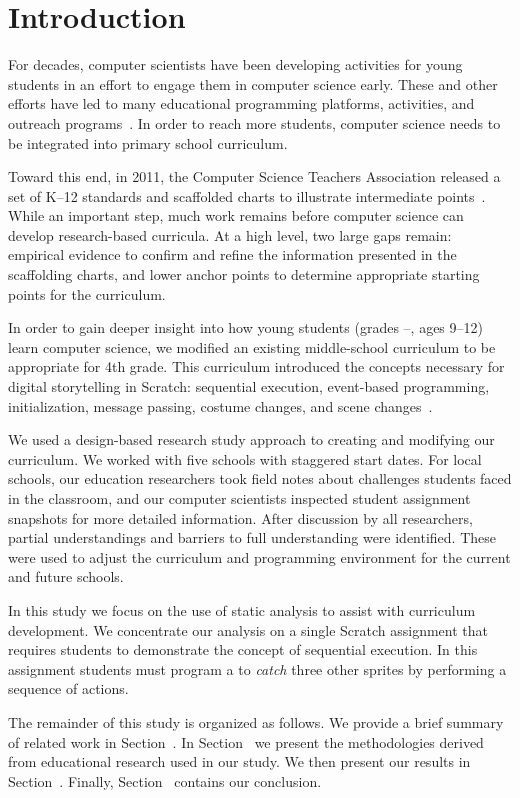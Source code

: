 \section{Introduction}
For decades, computer scientists have been developing activities for young
students in an effort to engage them in computer science early. These and other
efforts have led to many educational programming platforms, activities, and
outreach programs~\cite{wayanoutpost, georgiaoutreach,
  Franklin:2011:ATA:1953163.1953295, Maloney:2010:SPL:1868358.1868363,
  Dann:2000:MCP:343048.343070, Hood:2005:TPL:1067445.1067454, csunplugged}. In
order to reach more students, computer science needs to be integrated into
primary school curriculum.

Toward this end, in 2011, the Computer Science Teachers Association released a
set of K--12 standards and scaffolded charts to illustrate intermediate
points~\cite{cstastandards}. While an important step, much work remains before
computer science can develop research-based curricula. At a high level, two
large gaps remain: empirical evidence to confirm and refine the information
presented in the scaffolding charts, and lower anchor points to determine
appropriate starting points for the curriculum.

In order to gain deeper insight into how young students (grades
--, ages 9--12) learn computer science, we modified an existing
middle-school curriculum to be appropriate for 4th grade. This curriculum
introduced the concepts necessary for digital storytelling in Scratch:
sequential execution, event-based programming, initialization, message passing,
costume changes, and scene changes~\cite{Franklin:2013:SBO}.

We used a design-based research study approach to creating and modifying our
curriculum. We worked with five schools with staggered start dates. For local
schools, our education researchers took field notes about challenges students
faced in the classroom, and our computer scientists inspected student
assignment snapshots for more detailed information. After discussion by all
researchers, partial understandings and barriers to full understanding were
identified. These were used to adjust the curriculum and programming
environment for the current and future schools.

In this study we focus on the use of static analysis to assist with curriculum
development. We concentrate our analysis on a single Scratch assignment that
requires students to demonstrate the concept of sequential execution. In this
assignment students must program a \net{} to \emph{catch} three other sprites
by performing a sequence of actions.

The remainder of this study is organized as follows. We provide a brief summary
of related work in Section~. In
Section~ we present the methodologies derived from
educational research used in our study. We then present our results in
Section~. Finally, Section~
contains our conclusion.
